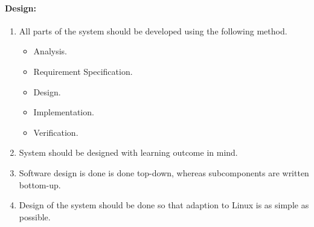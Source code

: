 \paragraph{Design:}
\begin{enumerate}[resume]
	\item All parts of the system should be developed using the following method. 
	\begin{itemize}
	 	\item Analysis.
	 	\item Requirement Specification.
	 	\item Design.
	 	\item Implementation.
	 	\item Verification.
	 \end{itemize} 
	 \item System should be designed with learning outcome in mind.
	 \item Software design is done is done top-down, whereas subcomponents are written bottom-up. 
	 \item Design of the system should be done so that adaption to Linux is as simple as possible.
\end{enumerate}